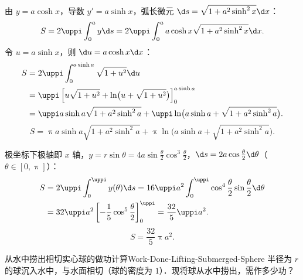 \begin{solution}
    由 $y = a\cosh x$，导数 $y' = a\sinh x$，弧长微元 $\d s = \sqrt{1 + a^2\sinh^2 x}\d x$：
    \begin{equation}
        S = 2\uppi \int_0^a y \d s = 2\uppi \int_0^a a\cosh x \sqrt{1 + a^2\sinh^2 x}\d x.
    \end{equation}
    令 $u = a\sinh x$，则 $\d u = a\cosh x \d x$：
    \begin{equation}
        \begin{aligned}
            S & = 2\uppi \int_0^{a\sinh a} \sqrt{1 + u^2}\d u                                                      \\
              & = \uppi \left[ u\sqrt{1 + u^2} + \ln\bigl(u + \sqrt{1 + u^2}\bigr) \right]_0^{a\sinh a}            \\
              & = \uppi a\sinh a \sqrt{1 + a^2\sinh^2 a} + \uppi\ln\bigl(a\sinh a + \sqrt{1 + a^2\sinh^2 a}\bigr).
        \end{aligned}
    \end{equation}
    \begin{equation}
        \boxed{S = \uppi a\sinh a \sqrt{1 + a^2\sinh^2 a} + \uppi\ln\bigl(a\sinh a + \sqrt{1 + a^2\sinh^2 a}\bigr).}
    \end{equation}


    极坐标下极轴即 $x$ 轴，$y = r\sin\theta = 4a\sin\frac{\theta}{2}\cos^3\frac{\theta}{2}$，$\d s = 2a\cos\frac{\theta}{2}\d\theta$（$\theta \in [0, \uppi]$）：
    \begin{equation}
        \begin{aligned}
            S & = 2\uppi \int_0^{\uppi} y(\theta)\d s = 16\uppi a^2 \int_0^{\uppi} \cos^4\frac{\theta}{2}\sin\frac{\theta}{2}\d\theta \\
              & = 32\uppi a^2 \left[ -\frac{1}{5}\cos^5\frac{\theta}{2} \right]_0^{\uppi} = \frac{32}{5}\uppi a^2.
        \end{aligned}
    \end{equation}
    \begin{equation}
        \boxed{S = \frac{32}{5}\uppi a^2.}
    \end{equation}
\end{solution}

\begin{problem}{从水中捞出相切实心球的做功计算}{Work-Done-Lifting-Submerged-Sphere}
    半径为 $r$ 的球沉入水中，与水面相切（球的密度为 $1$）．现将球从水中捞出，需作多少功？
\end{problem}

